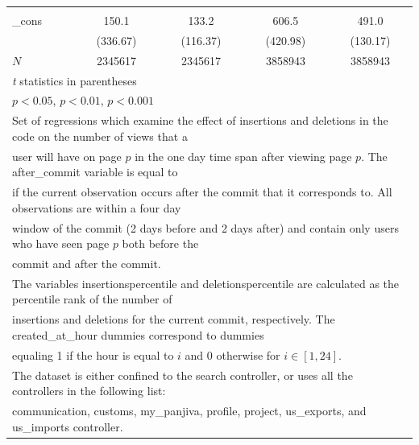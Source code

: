 \documentclass[10pt]{article}
\begin{document}
\begin{table}
{\begin{tabular}{l*{4}{c}}
        &                     &            &                     &      \\
        [1em]
        \_cons      &       150.1\sym{***}&       133.2\sym{***}&       606.5\sym{***}&       491.0\sym{***}\\
        &    (336.67)         &    (116.37)         &    (420.98)         &    (130.17)         \\
        \hline
        \(N\)       &     2345617         &     2345617         &     3858943         &     3858943         \\
        \hline\hline
        \multicolumn{5}{l}{\footnotesize \textit{t} statistics in parentheses}\\
        \multicolumn{5}{l}{\footnotesize \sym{*} \(p<0.05\), \sym{**} \(p<0.01\), \sym{***} \(p<0.001\)}\\
        \multicolumn{5}{l}{Set of regressions which examine the effect of insertions and deletions in the code on the number of views that a}\\
        \multicolumn{5}{l}{user will have on page $p$ in the one day time span after viewing page $p$. The after\_commit variable is equal to}\\
        \multicolumn{5}{l}{if the current observation occurs after the commit that it corresponds to. All observations are within a four day}\\
        \multicolumn{5}{l}{window of the commit (2 days before and 2 days after) and contain only users who have seen page $p$ both before the}\\
        \multicolumn{5}{l}{commit and after the commit.}\\
        \multicolumn{5}{l}{The variables insertionspercentile and deletionspercentile are calculated as the percentile rank of the number of}\\
        \multicolumn{5}{l}{insertions and deletions for the current commit, respectively. The created\_at\_hour dummies correspond to dummies}\\
        \multicolumn{5}{l}{equaling 1 if the hour is equal to $i$ and 0 otherwise for $i \in [1,24]$.}\\ 
        \multicolumn{5}{l}{The dataset is either confined to the search controller, or uses all the controllers in the following list:}\\
        \multicolumn{5}{l}{communication, customs, my\_panjiva, profile, project, us\_exports, and us\_imports controller.}
        \end{tabular}
}
\label{table:commit-percentiles-micro}
\end{table}
\end{document}
